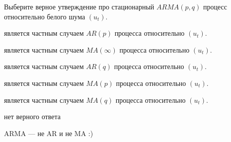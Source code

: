 
\begin{question}
Выберите верное утверждение про стационарный \(ARMA(p, q)\) процесс относительно белого шума \((u_t)\).
\begin{answerlist}
  \item является частным случаем \(AR(p)\) процесса относительно \((u_t)\).
  \item является частным случаем \(MA(\infty)\) процесса относительно \((u_t)\).
  \item является частным случаем \(AR(q)\) процесса относительно \((u_t)\).
  \item является частным случаем \(MA(p)\) процесса относительно \((u_t)\).
  \item является частным случаем \(MA(q)\) процесса относительно \((u_t)\).
  \item нет верного ответа
\end{answerlist}
\end{question}

\begin{solution}
ARMA --- не AR и не MA :)
\end{solution}

